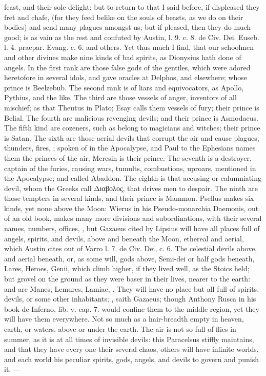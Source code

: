 {{feast, and their sole delight: but to return to that I said before, if
displeased they fret and chafe, (for they feed belike on the souls of
beasts, as we do on their bodies) and send many plagues amongst us; but
if pleased, then they do much good; is as vain as the rest and confuted
by Austin, l. 9. c. 8. de Civ. Dei. Euseb. l. 4. praepar. Evang. c. 6.
and others. Yet thus much I find, that our schoolmen and other
divines make nine kinds of bad spirits, as Dionysius hath done of
angels. In the first rank are those false gods of the gentiles, which
were adored heretofore in several idols, and gave oracles at Delphos,
and elsewhere; whose prince is Beelzebub. The second rank is of liars
and equivocators, as Apollo, Pythius, and the like. The third are those
vessels of anger, inventors of all mischief; as that Theutus in Plato;
Esay calls them vessels of fury; their prince is Belial. The
fourth are malicious revenging devils; and their prince is Asmodaeus.
The fifth kind are cozeners, such as belong to magicians and witches;
their prince is Satan. The sixth are those aerial devils that
corrupt the air and cause plagues, thunders, fires, \etc{}; spoken
of in the Apocalypse, and Paul to the Ephesians names them the princes
of the air; Meresin is their prince. The seventh is a destroyer,
captain of the furies, causing wars, tumults, combustions, uproars,
mentioned in the Apocalypse; and called Abaddon. The eighth is that
accusing or calumniating devil, whom the Greeks call \textgreek{Διαβολος}, that
drives men to despair. The ninth are those tempters in several kinds,
and their prince is Mammon. Psellus makes six kinds, yet none above the
Moon: Wierus in his Pseudo-monarchia Daemonis, out of an old book,
makes many more divisions and subordinations, with their several names,
numbers, offices, \etc{}, but Gazaeus cited by Lipsius will have all
places full of angels, spirits, and devils, above and beneath the
Moon, ethereal and aerial, which Austin cites out of Varro l. 7.
de Civ. Dei, c. 6. The celestial devils above, and aerial beneath, or,
as some will, gods above, Semi-dei or half gods beneath, Lares, Heroes,
Genii, which climb higher, if they lived well, as the Stoics held; but
grovel on the ground as they were baser in their lives, nearer to the
earth: and are Manes, Lemures, Lamiae, \etc{}. They will have no
place but all full of spirits, devils, or some other inhabitants;
, saith
Gazaeus; though Anthony Rusca in his book de Inferno, lib. v.
cap. 7. would confine them to the middle region, yet they will have
them everywhere. Not so much as a hair-breadth empty in heaven, earth,
or waters, above or under the earth. The air is not so full of flies in
summer, as it is at all times of invisible devils: this
Paracelsus stiffly maintains, and that they have every one their
several chaos, others will have infinite worlds, and each world his
peculiar spirits, gods, angels, and devils to govern and punish it.
---

}}
